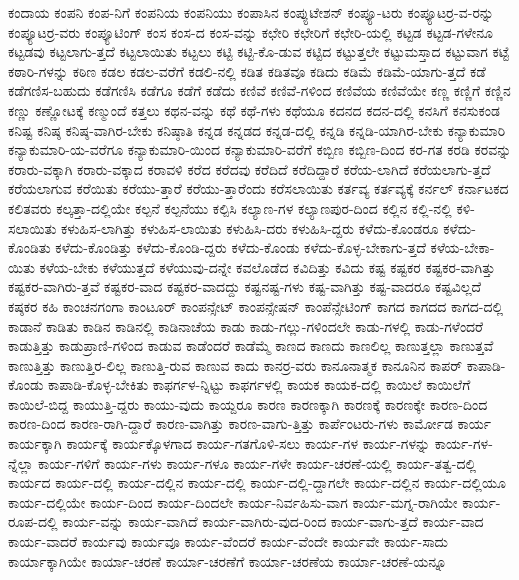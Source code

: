 {ಕಂದಾಯ
ಕಂಪನಿ
ಕಂಪ-ನಿಗೆ
ಕಂಪನಿಯ
ಕಂಪನಿಯು
ಕಂಪಾಸಿನ
ಕಂಪ್ಯುಟೇಶನ್
ಕಂಪ್ಯೂ-ಟರು
ಕಂಪ್ಯೂಟರ್ರ-ವ-ರನ್ನು
ಕಂಪ್ಯೂಟರ್ರ-ವರು
ಕಂಪ್ಯೂಟಿಂಗ್
ಕಂಸ
ಕಂಸ-ದ
ಕಂಸ-ವನ್ನು
ಕಛೇರಿ
ಕಛೇರಿಗೆ
ಕಛೇರಿ-ಯಲ್ಲಿ
ಕಟ್ಟಡ
ಕಟ್ಟಡ-ಗಳೇನೂ
ಕಟ್ಟಡವು
ಕಟ್ಟಲಾಗು-ತ್ತದೆ
ಕಟ್ಟಲಾಯಿತು
ಕಟ್ಟಲು
ಕಟ್ಟಿ
ಕಟ್ಟಿ-ಕೊ-ಡುವ
ಕಟ್ಟಿದ
ಕಟ್ಟುತ್ತಲೇ
ಕಟ್ಟುಮಸ್ತಾದ
ಕಟ್ಟುವಾಗ
ಕಟ್ಟೆ
ಕಠಾರಿ-ಗಳನ್ನು
ಕಠಿಣ
ಕಡಲ
ಕಡಲ-ವರೆಗೆ
ಕಡಲಿ-ನಲ್ಲಿ
ಕಡಿತ
ಕಡಿತವೂ
ಕಡಿದು
ಕಡಿಮೆ
ಕಡಿಮೆ-ಯಾಗು-ತ್ತದೆ
ಕಡೆ
ಕಡೆಗಣಿಸ-ಬಹುದು
ಕಡೆಗಣಿಸಿ
ಕಡೆಗೂ
ಕಡೆಗೆ
ಕಡೆದು
ಕಣಿವೆ
ಕಣಿವೆ-ಗಳಿಂದ
ಕಣಿವೆಯ
ಕಣಿವೆಯೇ
ಕಣ್ಣ
ಕಣ್ಣಿಗೆ
ಕಣ್ಣಿನ
ಕಣ್ಣು
ಕಣ್ಣೋಟಕ್ಕೆ
ಕಣ್ಮುಂದೆ
ಕತ್ತಲು
ಕಥನ-ವನ್ನು
ಕಥೆ
ಕಥೆ-ಗಳು
ಕಥೆಯೂ
ಕದನದ
ಕದನ-ದಲ್ಲಿ
ಕನಸಿಗೆ
ಕನಸುಕಂಡ
ಕನಿಷ್ಟ
ಕನಿಷ್ಠ
ಕನಿಷ್ಠ-ವಾಗಿರ-ಬೇಕು
ಕನಿಷ್ಠಾತಿ
ಕನ್ನಡ
ಕನ್ನಡದ
ಕನ್ನಡ-ದಲ್ಲಿ
ಕನ್ನಡಿ
ಕನ್ನಡಿ-ಯಾಗಿರ-ಬೇಕು
ಕನ್ಯಾಕುಮಾರಿ
ಕನ್ಯಾಕುಮಾರಿ-ಯ-ವರೆಗೂ
ಕನ್ಯಾಕುಮಾರಿ-ಯಿಂದ
ಕನ್ಯಾಕುಮಾರಿ-ವರೆಗೆ
ಕಬ್ಬಿಣ
ಕಬ್ಬಿಣ-ದಿಂದ
ಕರ-ಗತ
ಕರಡಿ
ಕರವನ್ನು
ಕರಾರು-ವಕ್ಕಾಗಿ
ಕರಾರು-ವಕ್ಕಾದ
ಕರಾವಳಿ
ಕರೆದ
ಕರೆದವು
ಕರೆದಿದೆ
ಕರೆದಿದ್ದಾರೆ
ಕರೆಯ-ಲಾಗಿದೆ
ಕರೆಯಲಾಗು-ತ್ತದೆ
ಕರೆಯಲಾಗುವ
ಕರೆಯಿತು
ಕರೆಯು-ತ್ತಾರೆ
ಕರೆಯು-ತ್ತಾರೆಂದು
ಕರೆಸಲಾಯಿತು
ಕರ್ತವ್ಯ
ಕರ್ತವ್ಯಕ್ಕೆ
ಕರ್ನಲ್
ಕರ್ನಾಟಕದ
ಕಲಿತವರು
ಕಲ್ಕತ್ತಾ-ದಲ್ಲಿಯೇ
ಕಲ್ಪನೆ
ಕಲ್ಪನೆಯು
ಕಲ್ಪಿಸಿ
ಕಲ್ಯಾಣ-ಗಳ
ಕಲ್ಯಾಣಪುರ-ದಿಂದ
ಕಲ್ಲಿನ
ಕಲ್ಲಿ-ನಲ್ಲಿ
ಕಳಿ-ಸಲಾಯಿತು
ಕಳುಹಿಸ-ಲಾಗಿತ್ತು
ಕಳುಹಿಸ-ಲಾಯಿತು
ಕಳುಹಿಸಿ-ದರು
ಕಳುಹಿಸಿ-ದ್ದರು
ಕಳೆದು-ಕೊಂಡರೂ
ಕಳೆದು-ಕೊಂಡಿತು
ಕಳೆದು-ಕೊಂಡಿತ್ತು
ಕಳೆದು-ಕೊಂಡಿ-ದ್ದರು
ಕಳೆದು-ಕೊಂಡು
ಕಳೆದು-ಕೊಳ್ಳ-ಬೇಕಾಗು-ತ್ತದೆ
ಕಳೆಯ-ಬೇಕಾ-ಯಿತು
ಕಳೆಯ-ಬೇಕು
ಕಳೆಯುತ್ತದೆ
ಕಳೆಯುವು-ದನ್ನೇ
ಕವಲೊಡೆದ
ಕವಿದಿತ್ತು
ಕವಿದು
ಕಷ್ಟ
ಕಷ್ಟಕರ
ಕಷ್ಟಕರ-ವಾಗಿತ್ತು
ಕಷ್ಟಕರ-ವಾಗಿರು-ತ್ತವೆ
ಕಷ್ಟಕರ-ವಾದ
ಕಷ್ಟಕರ-ವಾದದ್ದು
ಕಷ್ಟನಷ್ಟ-ಗಳು
ಕಷ್ಟ-ವಾಗಿತ್ತು
ಕಷ್ಟ-ವಾದರೂ
ಕಷ್ಟವಿಲ್ಲದೆ
ಕಷ್ಠಕರ
ಕಹಿ
ಕಾಂಚನಗಂಗಾ
ಕಾಂಟೂರ್
ಕಾಂಪನ್ಸೇಟ್
ಕಾಂಪನ್ಸೇಷನ್
ಕಾಂಪೆನ್ಸೇಟಿಂಗ್
ಕಾಗದ
ಕಾಗದದ
ಕಾಗದ-ದಲ್ಲಿ
ಕಾಡಾನೆ
ಕಾಡಿತು
ಕಾಡಿನ
ಕಾಡಿನಲ್ಲಿ
ಕಾಡಿನಾಚೆಯ
ಕಾಡು
ಕಾಡು-ಗಲ್ಲು-ಗಳಿಂದಲೇ
ಕಾಡು-ಗಳಲ್ಲಿ
ಕಾಡು-ಗಳೆಂದರೆ
ಕಾಡುತ್ತಿತ್ತು
ಕಾಡುಪ್ರಾಣಿ-ಗಳಿಂದ
ಕಾಡುವ
ಕಾಡೆಂದರೆ
ಕಾಡೆಮ್ಮೆ
ಕಾಣದ
ಕಾಣದು
ಕಾಣಲಿಲ್ಲ
ಕಾಣುತ್ತಲ್ಲಾ
ಕಾಣುತ್ತವೆ
ಕಾಣುತ್ತಿತ್ತು
ಕಾಣುತ್ತಿರ-ಲಿಲ್ಲ
ಕಾಣುತ್ತಿ-ರುವ
ಕಾಣುವ
ಕಾದು
ಕಾನರ್ರ-ವರು
ಕಾನೂನಾತ್ಮಕ
ಕಾನೂನಿನ
ಕಾಪರ್
ಕಾಪಾಡಿ-ಕೊಂಡು
ಕಾಪಾಡಿ-ಕೊಳ್ಳ-ಬೇಕಿತು
ಕಾಫರ್ಗಳ-ನ್ನಿಟ್ಟು
ಕಾಫರ್ಗಳಲ್ಲಿ
ಕಾಯಕ
ಕಾಯಕ-ದಲ್ಲಿ
ಕಾಯಿಲೆ
ಕಾಯಿಲೆಗೆ
ಕಾಯಿಲೆ-ಬಿದ್ದ
ಕಾಯುತ್ತಿ-ದ್ದರು
ಕಾಯು-ವುದು
ಕಾಯ್ದರೂ
ಕಾರಣ
ಕಾರಣಕ್ಕಾಗಿ
ಕಾರಣಕ್ಕೆ
ಕಾರಣಕ್ಕೇ
ಕಾರಣ-ದಿಂದ
ಕಾರಣ-ದಿಂದ
ಕಾರಣ-ರಾಗಿ-ದ್ದಾರೆ
ಕಾರಣ-ವಾಗಿತ್ತು
ಕಾರಣ-ವಾಗು-ತ್ತಿತ್ತು
ಕಾರ್ಪೆಂಟರು-ಗಳು
ಕಾರ್ಮೋಡ
ಕಾರ್ಯ
ಕಾರ್ಯಕ್ಕಾಗಿ
ಕಾರ್ಯಕ್ಕೆ
ಕಾರ್ಯಕ್ಕೊಳಗಾದ
ಕಾರ್ಯ-ಗತಗೊಳಿ-ಸಲು
ಕಾರ್ಯ-ಗಳ
ಕಾರ್ಯ-ಗಳನ್ನು
ಕಾರ್ಯ-ಗಳ-ನ್ನೆಲ್ಲಾ
ಕಾರ್ಯ-ಗಳಿಗೆ
ಕಾರ್ಯ-ಗಳು
ಕಾರ್ಯ-ಗಳೂ
ಕಾರ್ಯ-ಗಳೇ
ಕಾರ್ಯ-ಚರಣೆ-ಯಲ್ಲಿ
ಕಾರ್ಯ-ತತ್ವ-ದಲ್ಲಿ
ಕಾರ್ಯದ
ಕಾರ್ಯ-ದಲ್ಲಿ
ಕಾರ್ಯ-ದಲ್ಲಿನ
ಕಾರ್ಯ-ದಲ್ಲಿ
ಕಾರ್ಯ-ದಲ್ಲಿ-ದ್ದಾಗಲೇ
ಕಾರ್ಯ-ದಲ್ಲಿನ
ಕಾರ್ಯ-ದಲ್ಲಿಯೂ
ಕಾರ್ಯ-ದಲ್ಲಿಯೇ
ಕಾರ್ಯ-ದಿಂದ
ಕಾರ್ಯ-ದಿಂದಲೇ
ಕಾರ್ಯ-ನಿರ್ವಹಿಸು-ವಾಗ
ಕಾರ್ಯ-ಮಗ್ನ-ರಾಗಿಯೇ
ಕಾರ್ಯ-ರೂಪ-ದಲ್ಲಿ
ಕಾರ್ಯ-ವನ್ನು
ಕಾರ್ಯ-ವಾಗಿದೆ
ಕಾರ್ಯ-ವಾಗಿರು-ವುದ-ರಿಂದ
ಕಾರ್ಯ-ವಾಗು-ತ್ತದೆ
ಕಾರ್ಯ-ವಾದ
ಕಾರ್ಯ-ವಾದರೆ
ಕಾರ್ಯವು
ಕಾರ್ಯವೂ
ಕಾರ್ಯ-ವೆಂದರೆ
ಕಾರ್ಯ-ವೆಂದೇ
ಕಾರ್ಯವೇ
ಕಾರ್ಯ-ಸಾದು
ಕಾರ್ಯಾಕ್ಕಾಗಿಯೇ
ಕಾರ್ಯಾ-ಚರಣೆ
ಕಾರ್ಯಾ-ಚರಣೆಗೆ
ಕಾರ್ಯಾ-ಚರಣೆಯ
ಕಾರ್ಯಾ-ಚರಣೆ-ಯನ್ನೂ
}
